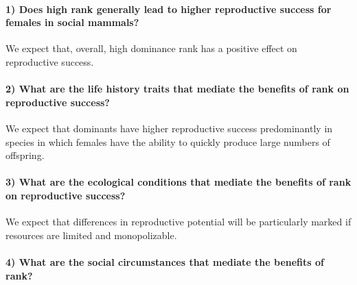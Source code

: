 \documentclass[]{article}
\let\oldparagraph\paragraph
\renewcommand{\paragraph}[1]{\oldparagraph{#1}\mbox{}}
\begin{document}
\hypertarget{does-high-rank-generally-lead-to-higher-reproductive-success-for-females-in-social-mammals}{%
\paragraph{\texorpdfstring{\textbf{1) Does high rank generally lead to
higher reproductive success for females in social
mammals?}}{1) Does high rank generally lead to higher reproductive success for females in social mammals?}}\label{does-high-rank-generally-lead-to-higher-reproductive-success-for-females-in-social-mammals}}

We expect that, overall, high dominance rank has a positive effect on
reproductive success.

\hypertarget{what-are-the-life-history-traits-that-mediate-the-benefits-of-rank-on-reproductive-success}{%
\paragraph{\texorpdfstring{\textbf{2) What are the life history traits
that mediate the benefits of rank on reproductive
success?}}{2) What are the life history traits that mediate the benefits of rank on reproductive success?}}\label{what-are-the-life-history-traits-that-mediate-the-benefits-of-rank-on-reproductive-success}}

We expect that dominants have higher reproductive success predominantly
in species in which females have the ability to quickly produce large
numbers of offspring.

\hypertarget{what-are-the-ecological-conditions-that-mediate-the-benefits-of-rank-on-reproductive-success}{%
\paragraph{\texorpdfstring{\textbf{3) What are the ecological conditions
that mediate the benefits of rank on reproductive
success?}}{3) What are the ecological conditions that mediate the benefits of rank on reproductive success?}}\label{what-are-the-ecological-conditions-that-mediate-the-benefits-of-rank-on-reproductive-success}}

We expect that differences in reproductive potential will be
particularly marked if resources are limited and monopolizable.

\hypertarget{what-are-the-social-circumstances-that-mediate-the-benefits-of-rank}{%
\paragraph{\texorpdfstring{\textbf{4) What are the social circumstances
that mediate the benefits of
rank?}}{4) What are the social circumstances that mediate the benefits of rank?}}\label{what-are-the-social-circumstances-that-mediate-the-benefits-of-rank}}
\end{document}
